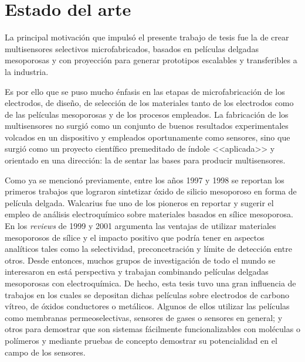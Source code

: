 \section{Estado del arte}
	 		    		
	La principal motivación que impulsó el presente trabajo de tesis fue la de crear multisensores selectivos microfabricados, basados en películas delgadas mesoporosas y con proyección para generar prototipos escalables y transferibles a la industria. 

	Es por ello que se puso mucho énfasis en las etapas de microfabricación de los electrodos, de diseño, de selección de los materiales tanto de los electrodos como de las películas mesoporosas y de los procesos empleados. La fabricación de los multisensores no surgió como un conjunto de buenos resultados experimentales volcados en un dispositivo y empleados oportunamente como sensores, sino que surgió como un proyecto científico premeditado de índole <<aplicada>> y orientado en una dirección: la de sentar las bases para producir multisensores.

	Como ya se mencionó previamente, entre los años 1997 y 1998 se reportan los primeros trabajos que lograron sintetizar óxido de silicio mesoporoso en forma de película delgada. \cite{Lu1997,Zhao1998a,Zhao1998,Brinker1999} Walcarius fue uno de los pioneros en reportar y sugerir el empleo de análisis electroquímico sobre materiales basados en sílice mesoporosa. En los \textit{reviews} de 1999\cite{walcarius1999} y 2001\cite{walcariussss2001} argumenta las ventajas de utilizar materiales mesoporosos de sílice y el impacto positivo que podría tener en aspectos analíticos tales como la selectividad, preconcetración y límite de detección entre otros. Desde entonces, muchos grupos de investigación de todo el mundo se interesaron en está perspectiva y trabajan combinando películas delgadas mesoporosas con electroquímica.\cite{Etienne2013,walcarius2007,Vila2016,Rohlfing2005,ConeoRodriguez2018,walcarius2013,Calvo2010,Andrieu-Brunsen2015,Gaitan2010} De hecho, esta tesis tuvo una gran influencia de trabajos en los cuales se depositan dichas películas sobre electrodos de carbono vítreo, de óxidos conductores o metálicos. Algunos de ellos  utilizar las películas como membranas permeoselectivas\cite{Fattakhova-Rohlfing2007,Andrieu-Brunsen2015,Calvo2009}, sensores de gases\cite{Wagner2013} o sensores en general\cite{Innocenzi2013,nasir2018}; y otros para demostrar que son sistemas fácilmente funcionalizables con moléculas\cite{Liu2003b,Calvo2008,Soler-Illia2012,Photong2009} o polímeros\cite{brunsen2011,Andrieu-Brunsen2015,Krohm2014} y mediante pruebas de concepto demostrar su potencialidad en el campo de los sensores.\cite{walcarius2008,Innocenzi2013}

